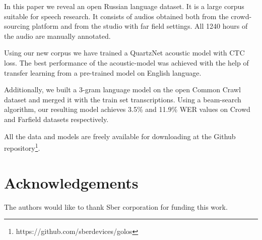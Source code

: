 \documentclass[a4paper]{article}
\begin{document}
In this paper we reveal an open Russian language dataset. It is a large corpus suitable for speech research. It consists of audios obtained both from the crowd-sourcing platform and from the studio with far field settings. All 1240 hours of the audio are manually annotated.

Using our new corpus we have trained a QuartzNet acoustic model with CTC loss. The best performance of the acoustic-model was achieved with the help of transfer learning from a pre-trained model on English language. 

Additionally, we built a 3-gram language model on the open Common Crawl dataset and merged it with the train set transcriptions. Using a beam-search algorithm, our resulting model achieves 3.5\% and 11.9\% WER values on Crowd and Farfield datasets respectively.

All the data and models are freely available for downloading at the Github repository\footnote{https://github.com/sberdevices/golos}.


\section{Acknowledgements}

The authors would like to thank Sber corporation for funding this work.





\end{document}
